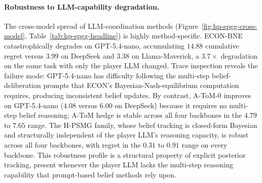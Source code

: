 \documentclass{article}
\begin{document}
\paragraph{Robustness to LLM-capability degradation.} The cross-model spread of
LLM-coordination methods (Figure~\ref{fig:hp-spgg-cross-model},
Table~\ref{tab:hp-spgg-headline}) is highly method-specific.
ECON-BNE catastrophically degrades on GPT-5.4-nano, accumulating $14.88$
cumulative regret versus $3.99$ on DeepSeek and $3.38$ on Llama-Maverick, a
$3.7\times$ degradation on the same task with only the player LLM changed.
Trace inspection reveals the failure mode: GPT-5.4-nano has difficulty
following the multi-step belief-deliberation prompts that ECON's
Bayesian-Nash-equilibrium computation requires, producing inconsistent belief
updates. By contrast, A-ToM-0 improves on GPT-5.4-nano ($4.08$ versus $6.00$
on DeepSeek) because it requires no multi-step belief reasoning; A-ToM hedge
is stable across all four backbones in the $4.79$ to $7.65$ range. The H-PSMG
family, whose belief tracking is closed-form Bayesian and structurally
independent of the player LLM's reasoning capacity, is robust across all four
backbones, with regret in the $0.31$ to $0.91$ range on every backbone. This
robustness profile is a structural property of explicit posterior tracking,
present whenever the player LLM lacks the multi-step reasoning capability that
prompt-based belief methods rely upon.
\end{document}

